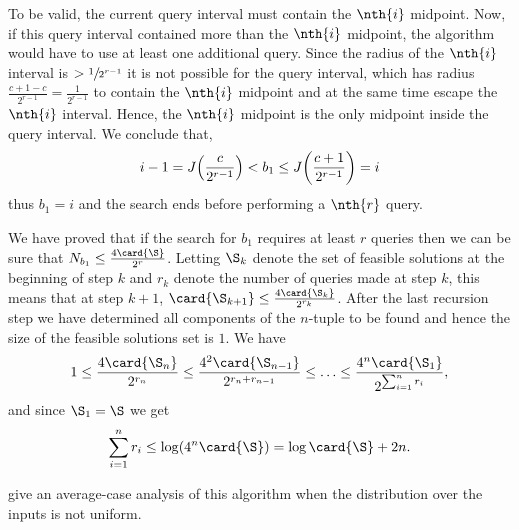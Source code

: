 To be valid, the current query interval must contain the \(\nth{i}\)
midpoint. Now, if this query interval contained more than the \(\nth{i}\)
midpoint, the algorithm would have to use at least one additional query.
Since the radius of the \(\nth{i}\) interval is \(> \sfrac{1}{2^{r-1}}\) it is
not possible for the query interval, which has radius \( \frac{c+1-c}{2^{r-1}}
 = \frac{1}{2^{r-1}}\) to contain the \(\nth{i}\) midpoint and at
the same time escape the \(\nth{i}\) interval. Hence, the \(\nth{i}\) midpoint
is the only midpoint inside the query interval. We conclude that,
\begin{displaymath}
i-1 = J\mleft(\frac{c}{2^{r-1}}\mright) < b_1 \le J\mleft(\frac{c+1}{2^{r-1}}\mright) = i
\end{displaymath}
thus $b_1 = i$ and the search ends before performing a $\nth{r}$ query.

We have proved that if the search for $b_1$ requires at least $r$ queries then
we can be sure that $N_{b_1} \le \frac{4\card{\S}}{2^r}$. Letting \(\S_{k}\)
denote the set of feasible solutions at the beginning of step \(k\) and
\(r_k\) denote the number of queries made at step \(k\), this means that at
step \(k+1\), \(\card{\S_{k+1}} \le \frac{4\card{\S_k}}{2^{r_k}}\).
After the last recursion step we have determined all components of
the \(n\)-tuple to be found and hence the size of the feasible solutions set
is \(1\). We have
\begin{displaymath}
1 \le \frac{4\card{\S_n}}{2^{r_n}} \le \frac{4^2\card{\S_{n-1}}}{2^{r_n +
r_{n-1}}} \le \ldots \le \frac{4^n\card{\S_1}}{2^{\sum_{i=1}^{n} r_i}},
\end{displaymath}
and since \(\S_1 = \S\) we get
\begin{displaymath}
\sum_{i=1}^{n} r_i \le \log (4^n \card{\S}) = \log \card{\S} + 2n.
\end{displaymath}

\citet*{moran:2015} give an average-case analysis of this algorithm when the
distribution over the inputs is not uniform.


